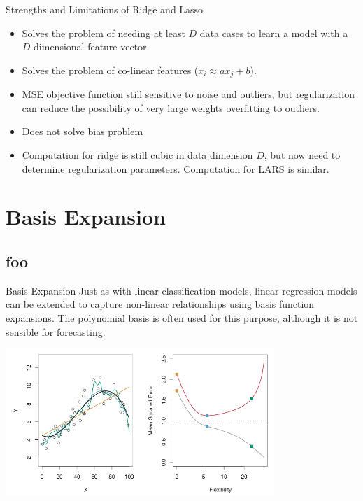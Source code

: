 \documentclass[serif,xcolor=pdftex,dvipsnames,table,hyperref={bookmarks=false,breaklinks}]{beamer}
\begin{document}
\begin{frame}[t]{Strengths and Limitations of Ridge and Lasso} 

\begin{itemize}
\item Solves the problem of needing at least $D$ data cases to learn a model with a $D$
dimensional feature vector.

\pause\item Solves the problem of co-linear features ($x_i \approx ax_j +b$).

\pause\item MSE objective function still sensitive to noise and outliers, but regularization
can reduce the possibility of very large weights overfitting to outliers.

\pause\item Does not solve bias problem

\pause\item Computation for ridge is still cubic in data dimension $D$, but now need to
determine regularization parameters. Computation for LARS is similar.


\end{itemize}

\end{frame}

\section{Basis Expansion}
\subsection{foo}

\begin{frame}[t]{Basis Expansion} 
Just as with linear classification models, linear regression models can be extended to
capture non-linear relationships using basis function expansions. The polynomial basis is
often used for this purpose, although it is not sensible for forecasting.

\pause
\center
\includegraphics[width=4in]{../Figures/polynomial_regression.png}

\end{frame}
\end{document}
